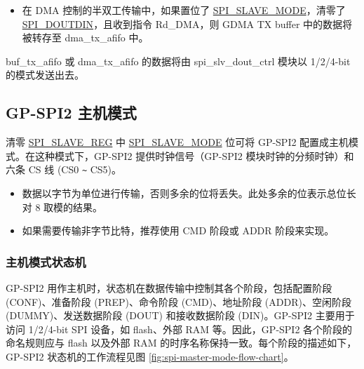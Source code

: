 \documentclass[main\_\_CN.tex]{subfiles}
\begin{document}
\begin{itemize}
\begin{itemize}
        \item 在 DMA 控制的半双工传输中，如果置位了 \hyperref[fielddesc:SPISLAVEMODE]{SPI\_SLAVE\_MODE}，清零了 \hyperref[fielddesc:SPIDOUTDIN]{SPI\_DOUTDIN}，且收到指令 Rd\_DMA，则 GDMA TX buffer 中的数据将被转存至 dma\_tx\_afifo 中。

    \end{itemize}

buf\_tx\_afifo 或 dma\_tx\_afifo 的数据将由 spi\_slv\_dout\_ctrl 模块以 1/2/4-bit 的模式发送出去。
\end{itemize}

\subsection{GP-SPI2 主机模式}\label{sec:gp-spi2-master-mode}
清零 \hyperref[regdesc:SPISLAVEREG]{SPI\_SLAVE\_REG} 中 \hyperref[fielddesc:SPISLAVEMODE]{SPI\_SLAVE\_MODE} 位可将 GP-SPI2 配置成主机模式。在这种模式下，GP-SPI2 提供时钟信号（GP-SPI2 模块时钟的分频时钟）和六条 CS 线 (CS0 \verb+~+ CS5)。

\begin{tiplisting}
\vspace{-2em}
\begin{itemize}
    \item 数据以字节为单位进行传输，否则多余的位将丢失。此处多余的位表示总位长对 8 取模的结果。
    \item 如果需要传输非字节比特，推荐使用 CMD 阶段或 ADDR 阶段来实现。
\end{itemize}
\end{tiplisting}

\subsubsection{主机模式状态机}
\label{sec:gp-spi2-state-machine}

GP-SPI2 用作主机时，状态机在数据传输中控制其各个阶段，包括配置阶段 (CONF)、准备阶段 (PREP)、命令阶段 (CMD)、地址阶段 (ADDR)、空闲阶段 (DUMMY)、发送数据阶段 (DOUT) 和接收数据阶段 (DIN)。GP-SPI2 主要用于访问 1/2/4-bit SPI 设备，如 flash、外部 RAM 等。因此，GP-SPI2 各个阶段的命名规则应与 flash 以及外部 RAM 的时序名称保持一致。每个阶段的描述如下，GP-SPI2 状态机的工作流程见图  \ref{fig:spi-master-mode-flow-chart}。
\end{document}
